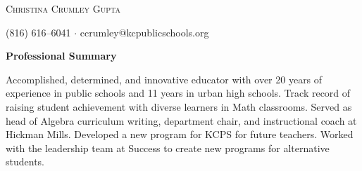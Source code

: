 \documentclass[10pt,A4]{article}
\newcommand{\cvsection}[1]
{
	\begin{center}
		\large\textcolor{sectcol}{\textbf{#1}}
	\end{center}
}
\begin{document}
\pagestyle{fancy}	








\vspace{-8pt}
\begin{center}
	\HUGE \textsc{Christina Crumley Gupta}\\
\end{center}

\begin{center}
    \large{\textcolor{sectcol}{(816) 616--6041} $\cdot$ \textcolor{sectcol}{ccrumley@kcpublicschools.org}}
\end{center}

\vspace{1pt}

\vspace{-4pt}
\cvsection{Professional Summary}
Accomplished, determined, and innovative educator with over 20 years of experience in public schools and 11 years in urban high schools. Track record of raising student achievement with diverse learners in Math classrooms. Served as head of Algebra curriculum writing, department chair, and instructional coach at Hickman Mills. Developed a new program for KCPS for future teachers. Worked with the leadership team at Success to create new programs for alternative students.\\
\end{document}

